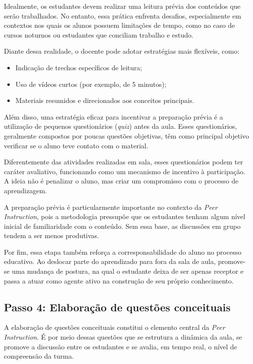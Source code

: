 Idealmente, os estudantes devem realizar uma leitura prévia dos conteúdos que serão trabalhados. No entanto, essa prática enfrenta desafios, especialmente em contextos nos quais os alunos possuem limitações de tempo, como no caso de cursos noturnos ou estudantes que conciliam trabalho e estudo.

Diante dessa realidade, o docente pode adotar estratégias mais flexíveis, como:

\begin{itemize}
    \item Indicação de trechos específicos de leitura;
    \item Uso de vídeos curtos (por exemplo, de 5 minutos);
    \item Materiais resumidos e direcionados aos conceitos principais.
\end{itemize}

Além disso, uma estratégia eficaz para incentivar a preparação prévia é a utilização de pequenos questionários (\textit{quiz}) antes da aula. Esses questionários, geralmente compostos por poucas questões objetivas, têm como principal objetivo verificar se o aluno teve contato com o material.

Diferentemente das atividades realizadas em sala, esses questionários podem ter caráter avaliativo, funcionando como um mecanismo de incentivo à participação. A ideia não é penalizar o aluno, mas criar um compromisso com o processo de aprendizagem.

A preparação prévia é particularmente importante no contexto da {\it Peer Instruction}, pois a metodologia pressupõe que os estudantes tenham algum nível inicial de familiaridade com o conteúdo. Sem essa base, as discussões em grupo tendem a ser menos produtivas.

Por fim, essa etapa também reforça a corresponsabilidade do aluno no processo educativo. Ao deslocar parte do aprendizado para fora da sala de aula, promove-se uma mudança de postura, na qual o estudante deixa de ser apenas receptor e passa a atuar como agente ativo na construção de seu próprio conhecimento.

\subsection{Passo 4: Elaboração de questões conceituais}

A elaboração de questões conceituais constitui o elemento central da {\it Peer Instruction}. É por meio dessas questões que se estrutura a dinâmica da aula, se promove a discussão entre os estudantes e se avalia, em tempo real, o nível de compreensão da turma.

